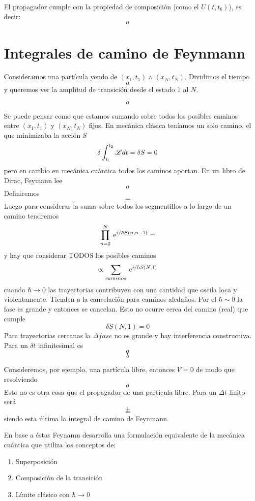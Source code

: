 \documentclass[10pt,oneside]{CBFT_book}
\begin{document}
El propagador cumple con la propiedad de composición (como el $U(t,t_0)$), es decir:
\[
	a
\]

\section{Integrales de camino de Feynmann}

Consideramos una partícula yendo de $(x_1,t_1)$ a $(x_N,t_N)$. Dividimos el tiempo 
\[
	a
\]
y queremos ver la amplitud de transición desde el estado 1 al $N$.

\[
	a
\]

Se puede pensar como que estamos sumando sobre todos los posibles caminos entre $(x_1,t_1)$ y $(x_N,t_N)$ 
fijos. En mecánica clásica teníamos un solo camino, el que minimizaba la acción $S$
\[
	\delta \int_{t_1}^{t_2} \mathscr{L} dt = \delta S = 0
\]
pero en cambio en mecánica cuántica todos los caminos aportan. En un libro de Dirac, Feymann lee 
\[
	a
\]
Definiremos
\[
	\equiv 
\]
Luego para considerar la suma sobre todos los segmentillos a lo largo de un camino tendremos
\[
	\prod_{n=2}^N \:\mathrm{e}^{i/\hbar S(n,n-1)} =
\]
y hay que considerar TODOS los posibles caminos 
\[
	\propto \sum_{caminos} \:\mathrm{e}^{i/\hbar S(N,1)} 
\]
cuando $\hbar \to 0$ las trayectorias contribuyen con una cantidad que oscila loca y violentamente. Tienden a 
la cancelación para caminos aledaños. Por el $\hbar \sim 0$ la fase es grande y entonces se cancelan.
Esto no ocurre cerca del camino (real) que cumple 
\[
	\delta S(N,1) = 0
\]
Para trayectorias cercanas la $\Delta fase$ no es grande y hay interferencia constructiva.
Para un $\delta t$ infinitesimal es 
\[
	a
\]
\[
	b
\]

Consideremos, por ejemplo, una partícula libre, entonces $V=0$ de modo que resolviendo 
\[
	a
\]
Esto no es otra cosa que el propagador de una partícula libre. Para un $\Delta t$ finito será 
\[
	+
\]
\[
	=
\]
siendo esta última la integral de camino de Feynmann.

En base a éstas Feynamn desarrolla una formulación equivalente de la mecánica cuántica que utiliza los 
conceptos de:
\begin{enumerate}
 \item Superposición
 \item Composición de la transición
 \item Límite clásico con $\hbar \to 0$
\end{enumerate}
\end{document}

